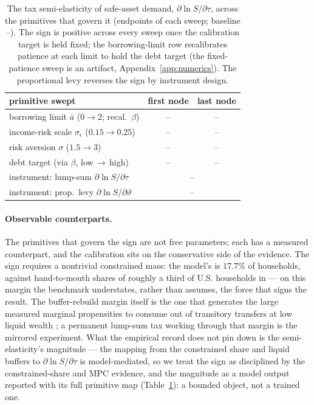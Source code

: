 \documentclass[12pt]{article}
\providecommand{\pendingnum}{\textit{--}}
\providecommand{\epsTau}{\pendingnum}\providecommand{\epsLevy}{\pendingnum}
\providecommand{\epsRiskLo}{\pendingnum}\providecommand{\epsRiskHi}{\pendingnum}
\providecommand{\epsSigLo}{\pendingnum}\providecommand{\epsSigHi}{\pendingnum}
\providecommand{\epsBetaLo}{\pendingnum}\providecommand{\epsBetaHi}{\pendingnum}
\providecommand{\epsAbarRecalLo}{\pendingnum}\providecommand{\epsAbarRecalHi}{\pendingnum}
\newcommand{\Sfun}{S}
\begin{document}
\begin{table}[!htb]
\centering
\caption{The tax semi-elasticity of safe-asset demand, $\partial\ln\Sfun/\partial\tau$,
across the primitives that govern it (endpoints of each sweep; baseline
$\epsTau$). The sign is positive across every sweep once the calibration
target is held fixed; the borrowing-limit row recalibrates patience at each
limit to hold the debt target (the fixed-patience sweep is an artifact,
Appendix~\ref{app:numerics}). The proportional levy reverses the sign by
instrument design.}
\label{tab:elasticitymap}
\begin{tabular}{lcc}
\toprule
primitive swept & first node & last node \\
\midrule
borrowing limit $\bar a$ ($0\to2$; recal.\ $\beta$) & $\epsAbarRecalLo$ & $\epsAbarRecalHi$ \\
income-risk scale $\sigma_\epsilon$ ($0.15\to0.25$)     & $\epsRiskLo$ & $\epsRiskHi$ \\
risk aversion $\sigma$ ($1.5\to3$)                      & $\epsSigLo$  & $\epsSigHi$ \\
debt target (via $\beta$, low\,$\to$\,high)             & $\epsBetaLo$ & $\epsBetaHi$ \\
\midrule
instrument: lump-sum $\partial\ln\Sfun/\partial\tau$ & \multicolumn{2}{c}{$\epsTau$} \\
instrument: prop.\ levy $\partial\ln\Sfun/\partial\vartheta$ & \multicolumn{2}{c}{$\epsLevy$} \\
\bottomrule
\end{tabular}
\end{table}

\paragraph{Observable counterparts.} The primitives that govern the sign are
not free parameters; each has a measured counterpart, and the calibration
sits on the conservative side of the evidence. The sign requires a
nontrivial constrained mass: the model's is $17.7\%$ of households, against
hand-to-mouth shares of roughly a third of U.S. households in
\citet{kaplanviolanteweidner2014} --- on this margin the benchmark
understates, rather than assumes, the force that signs the result. The
buffer-rebuild margin itself is the one that generates the large measured
marginal propensities to consume out of transitory transfers at low liquid
wealth \citep{kaplan2018}; a permanent lump-sum tax working through that
margin is the mirrored experiment. What the empirical record does not pin
down is the semi-elasticity's magnitude --- the mapping from the
constrained share and liquid buffers to $\partial\ln\Sfun/\partial\tau$ is
model-mediated, so we treat the sign as disciplined by the
constrained-share and MPC evidence, and the magnitude as a model output
reported with its full primitive map (Table~\ref{tab:elasticitymap}): a
bounded object, not a trained one.
\end{document}
